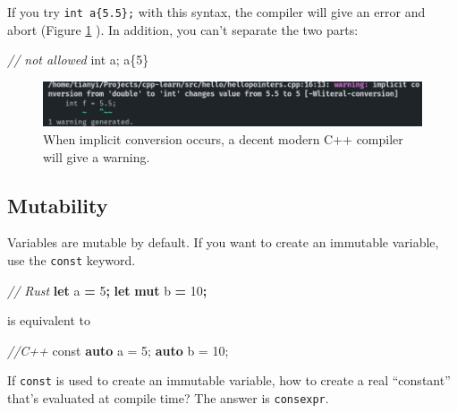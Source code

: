\documentclass[
]{book}
\newenvironment{Shaded}{\begin{snugshade}}{\end{snugshade}}
\newcommand{\AttributeTok}[1]{\textcolor[rgb]{0.77,0.63,0.00}{#1}}
\newcommand{\CommentTok}[1]{\textcolor[rgb]{0.56,0.35,0.01}{\textit{#1}}}
\newcommand{\DataTypeTok}[1]{\textcolor[rgb]{0.13,0.29,0.53}{#1}}
\newcommand{\DecValTok}[1]{\textcolor[rgb]{0.00,0.00,0.81}{#1}}
\newcommand{\KeywordTok}[1]{\textcolor[rgb]{0.13,0.29,0.53}{\textbf{#1}}}
\newcommand{\NormalTok}[1]{#1}
\newcommand{\OperatorTok}[1]{\textcolor[rgb]{0.81,0.36,0.00}{\textbf{#1}}}
\begin{document}
If you try \texttt{int\ a\{5.5\};} with this syntax, the compiler will give an error and abort (Figure \ref{fig:braces} ). In addition, you can't separate the two parts:

\begin{Shaded}
\begin{Highlighting}[]
\CommentTok{// not allowed}
\DataTypeTok{int}\NormalTok{ a;}
\NormalTok{a\{}\DecValTok{5}\NormalTok{\}}
\end{Highlighting}
\end{Shaded}

\begin{figure}
\centering
\includegraphics{img/equal.png}
\caption{\label{fig:braces}When implicit conversion occurs, a decent modern C++ compiler will give a warning.}
\end{figure}

\hypertarget{mutability}{%
\subsection{Mutability}\label{mutability}}

Variables are mutable by default. If you want to create an immutable variable, use the \texttt{const} keyword.

\begin{Shaded}
\begin{Highlighting}[]
\CommentTok{// Rust}
\KeywordTok{let}\NormalTok{ a }\OperatorTok{=} \DecValTok{5}\OperatorTok{;}
\KeywordTok{let} \KeywordTok{mut}\NormalTok{ b }\OperatorTok{=} \DecValTok{10}\OperatorTok{;}
\end{Highlighting}
\end{Shaded}

is equivalent to

\begin{Shaded}
\begin{Highlighting}[]
\CommentTok{//C++}
\AttributeTok{const} \KeywordTok{auto}\NormalTok{ a = }\DecValTok{5}\NormalTok{;}
\KeywordTok{auto}\NormalTok{ b = }\DecValTok{10}\NormalTok{;}
\end{Highlighting}
\end{Shaded}

If \texttt{const} is used to create an immutable variable, how to create a real ``constant'' that's evaluated at compile time? The answer is \texttt{consexpr}.
\end{document}
